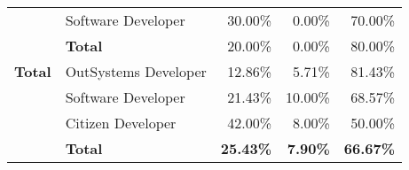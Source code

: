 \begin{table}[tb]
\begin{tabular}{llrrr}
                              & Software Developer   & 30.00\%                                                           & 0.00\%                                                                  & 70.00\%                                                       \\
                              & \textbf{Total}       & 20.00\%                                                           & 0.00\%                                                                  & 80.00\%                                                       \\ \hline
    \rowcolor[HTML]{EFEFEF} 
    \textbf{Total}            & OutSystems Developer & 12.86\%                                                           & 5.71\%                                                                  & 81.43\%                                                       \\
    \rowcolor[HTML]{EFEFEF} 
                              & Software Developer   & 21.43\%                                                           & 10.00\%                                                                 & 68.57\%                                                       \\
    \rowcolor[HTML]{EFEFEF} 
                              & Citizen Developer    & 42.00\%                                                           & 8.00\%                                                                  & 50.00\%                                                       \\
    \rowcolor[HTML]{EFEFEF} 
                              & \textbf{Total}       & \textbf{25.43\%}                                                  & \textbf{7.90\%}                                                         & \textbf{66.67\%}                                              \\ \hline
    \end{tabular}
    \end{table}


